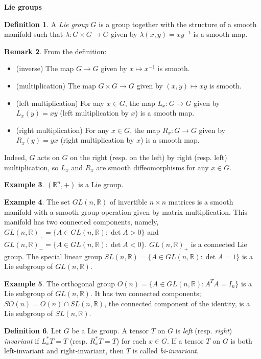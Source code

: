 \documentclass{amsart}
\numberwithin{equation}{section}
\newcommand{\bR}{\mathbb{R}}
\theoremstyle{definition}
\newtheorem{definition}{Definition} [section]
\newtheorem{example}[definition]{Example}
\newtheorem{remark}[definition]{Remark}
\theoremstyle{theorem}
\begin{document}
\noindent
{\bf \large Lie groups}

\begin{definition}
A {\em Lie group} $G$ is a group together with the structure of a smooth manifold such that $\lambda : G \times G \to G$ given by $\lambda(x,y) = xy^{-1}$ is a smooth map. 
\end{definition}

\begin{remark}
From the definition:
\begin{itemize}
\item (inverse) The map $G \to G$ given by $x \mapsto x^{-1}$ is smooth.
\item (multiplication) The map $G \times G \to G$ given by $(x,y)\mapsto xy$ is smooth.
\item (left multiplication) For any $x\in G$, the map $L_x:G\to G$ given by 
$L_x(y)=xy$ (left multiplication by $x$) is a  smooth map.
\item (right multiplication) For any $x\in G$, the map $R_x:G\to G$ given by 
$R_x(y)=yx$ (right multiplication by $x$) is a  smooth map. 
\end{itemize}
Indeed, $G$ acts on $G$ on the right (resp. on the left) by right (resp. left) multiplication, so 
$L_x$ and $R_x$ are smooth diffeomorphisms for any $x\in G$.
\end{remark}


\begin{example}
$(\bR^n, +)$  is a Lie group.
\end{example}

\begin{example}
The set $GL(n,\bR)$ of invertible $n\times n$ matrices is a smooth manifold with a smooth group operation given by matrix multiplication. 
This manifold has two connected components, namely, $GL(n,\bR)_+=\{ A\in GL(n,\bR):\det A>0\}$ and 
$GL(n,\mathbb{R})_-=\{ A\in GL(n,\bR):\det A<0\}$. $GL(n,\bR)_+$ is a connected Lie group. 
The special linear group $SL(n,\bR)=\{A\in GL(n,\bR):\det A = 1\} $ is a Lie subgroup of $GL(n,\bR)$.
 \end{example}

\begin{example}
The orthogonal group $O(n) = \{A \in GL(n,\bR) : A^T A = I_n\}$
is a Lie subgroup of $GL(n,\bR)$. It has two connected components;
$SO(n)=O(n)\cap SL(n,\bR)$, the connected component of the identity,
is a Lie subgroup of $SL(n,\bR)$. 
\end{example}

\begin{definition}\label{invariant-tensor}
Let $G$ be a Lie group. A tensor $T$ on $G$ is {\em left} (resp. {\em right}) {\em invariant} if $L_x^*T = T$
(resp. $R_x^*T=T$)  for each $x \in G$. 
If a tensor $T$ on $G$ is both left-invariant and right-invariant, then $T$ is called {\em bi-invariant}. 
\end{definition}
\end{document}
